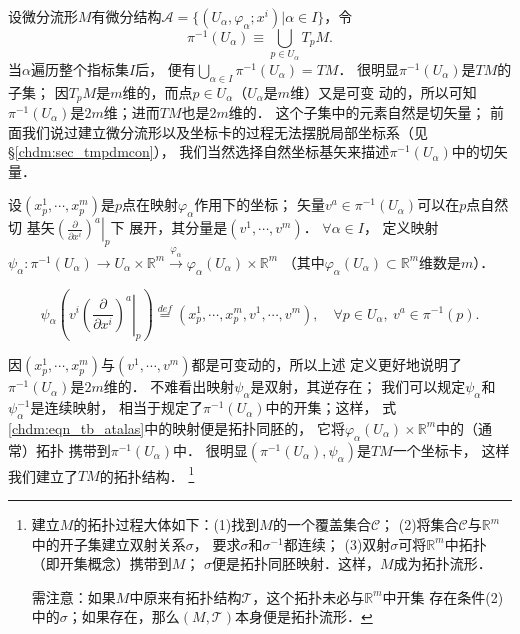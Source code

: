设微分流形$M$有微分结构$\mathscr{A}=\{(U_\alpha,\varphi_\alpha;x^i)|\alpha \in I \}$，令
\begin{equation}
    \pi^{-1} (U_\alpha) \equiv \bigcup _{p\in U_\alpha} T_pM .
\end{equation}
当$\alpha$遍历整个指标集$I$后，
便有$\bigcup _{\alpha \in I}  \pi^{-1} (U_\alpha) = TM$．
很明显$\pi^{-1} (U_\alpha)$是$TM$的子集；
因$T_pM$是$m$维的，而点$p\in U_\alpha$（$U_\alpha$是$m$维）又是可变
动的，所以可知$\pi^{-1} (U_\alpha)$是$2m$维；进而$TM$也是$2m$维的．
这个子集中的元素自然是切矢量；
前面我们说过建立微分流形以及坐标卡的过程无法摆脱局部坐标系（见\S \ref{chdm:sec_tmpdmcon}），
我们当然选择自然坐标基矢来描述$\pi^{-1} (U_\alpha)$中的切矢量．


设$(x_p^1,\cdots,x_p^m)$是$p$点在映射$\varphi_\alpha$作用下的坐标；
矢量$v^a\in \pi^{-1} (U_\alpha)$可以在$p$点自然切
基矢$\left.\left(\frac{\partial }{\partial x^i}\right)^a \right | _p$下
展开，其分量是$(v^1,\cdots,v^m)$．
$\forall \alpha \in I$，
定义映射$\psi_\alpha: \pi^{-1} (U_\alpha) \to U_\alpha \times \mathbb{R}^m 
\overset{\varphi_\alpha}{\longrightarrow} \varphi_\alpha(U_\alpha) \times \mathbb{R}^m $
（其中$\varphi_\alpha(U_\alpha) \subset \mathbb{R}^m$维数是$m$）．
\begin{small}
\begin{equation}\label{chdm:eqn_tb_atalas}
    \psi_\alpha\left(v^i \left. \left(\frac{\partial }{\partial x^i}\right)^a 
    \right | _p \right) \overset{def}{=} \left(x_p^1,\cdots,x_p^m, v^1,\cdots,v^m\right),
    \quad \forall p\in U_\alpha,\ v^a\in \pi^{-1} (p).
\end{equation}
\end{small}
因$(x_p^1,\cdots,x_p^m)$与$(v^1,\cdots,v^m)$都是可变动的，所以上述
定义更好地说明了$\pi^{-1} (U_\alpha)$是$2m$维的．
不难看出映射$\psi_\alpha$是双射，其逆存在；
我们可以规定$\psi_\alpha$和$\psi_\alpha^{-1}$是连续映射，
相当于规定了$\pi^{-1} (U_\alpha)$中的开集；这样，
式\eqref{chdm:eqn_tb_atalas}中的映射便是拓扑同胚的，
它将$\varphi_\alpha(U_\alpha) \times \mathbb{R}^m $中的（通常）拓扑
携带到$\pi^{-1} (U_\alpha)$中．
很明显$(\pi^{-1} (U_\alpha),\psi_\alpha)$是$TM$一个坐标卡，
这样我们建立了$TM$的拓扑结构．
{\footnote{建立$M$的拓扑过程大体如下：(1)找到$M$的一个覆盖集合$\mathcal{C}$；
        (2)将集合$\mathcal{C}$与$\mathbb{R}^m$中的开子集建立双射关系$\sigma$，
        要求$\sigma$和$\sigma^{-1}$都连续；
        (3)双射$\sigma$可将$\mathbb{R}^m$中拓扑（即开集概念）携带到$M$；
        $\sigma$便是拓扑同胚映射．这样，$M$成为拓扑流形．
        
    需注意：如果$M$中原来有拓扑结构$\mathcal{T}$，这个拓扑未必与$\mathbb{R}^m$中开集
存在条件(2)中的$\sigma$；如果存在，那么$(M,\mathcal{T})$本身便是拓扑流形．}}



